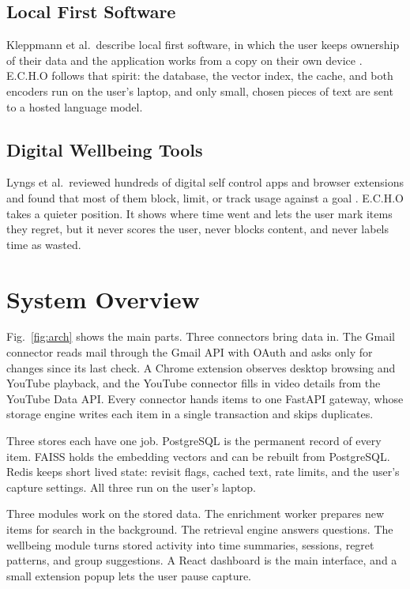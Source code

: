 \documentclass[conference]{IEEEtran}
\begin{document}
\subsection{Local First Software}
Kleppmann et al.\ describe local first software, in which the user keeps ownership of their data and the application works from a copy on their own device \cite{b12}. E.C.H.O follows that spirit: the database, the vector index, the cache, and both encoders run on the user's laptop, and only small, chosen pieces of text are sent to a hosted language model.

\subsection{Digital Wellbeing Tools}
Lyngs et al.\ reviewed hundreds of digital self control apps and browser extensions and found that most of them block, limit, or track usage against a goal \cite{b14}. E.C.H.O takes a quieter position. It shows where time went and lets the user mark items they regret, but it never scores the user, never blocks content, and never labels time as wasted.

\section{System Overview}\label{sec:overview}
Fig.~\ref{fig:arch} shows the main parts. Three connectors bring data in. The Gmail connector reads mail through the Gmail API with OAuth and asks only for changes since its last check. A Chrome extension observes desktop browsing and YouTube playback, and the YouTube connector fills in video details from the YouTube Data API. Every connector hands items to one FastAPI gateway, whose storage engine writes each item in a single transaction and skips duplicates.

Three stores each have one job. PostgreSQL is the permanent record of every item. FAISS holds the embedding vectors and can be rebuilt from PostgreSQL. Redis keeps short lived state: revisit flags, cached text, rate limits, and the user's capture settings. All three run on the user's laptop.

Three modules work on the stored data. The enrichment worker prepares new items for search in the background. The retrieval engine answers questions. The wellbeing module turns stored activity into time summaries, sessions, regret patterns, and group suggestions. A React dashboard is the main interface, and a small extension popup lets the user pause capture.
\end{document}

